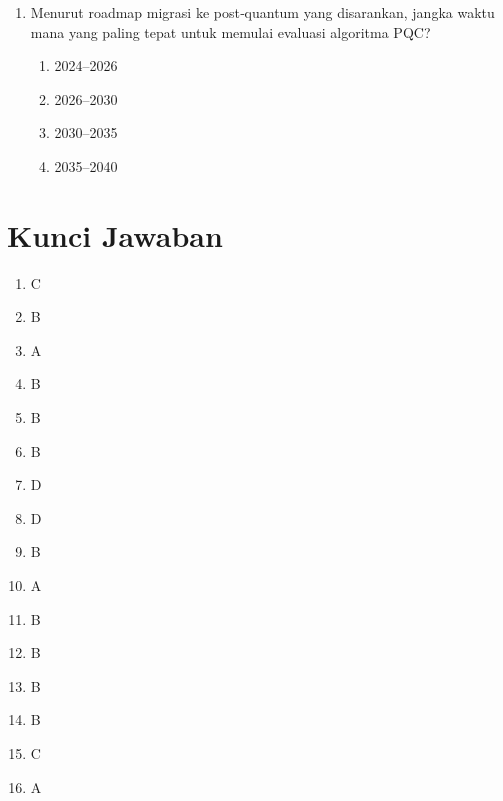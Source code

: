 \documentclass[12pt]{article}
\begin{document}
\begin{enumerate}[label=\textbf{Soal \arabic*.}, leftmargin=*, itemsep=1.5em]
\item Menurut roadmap migrasi ke post‑quantum yang disarankan, jangka waktu mana yang paling tepat untuk memulai evaluasi algoritma PQC?
\begin{enumerate}[label=\Alph*.]
    \item 2024–2026
    \item 2026–2030
    \item 2030–2035
    \item 2035–2040
\end{enumerate}

\end{enumerate}

\newpage
\section*{Kunci Jawaban}
\begin{enumerate}[label=\textbf{Soal \arabic*.}]
    \item C
    \item B
    \item A
    \item B
    \item B
    \item B
    \item D
    \item D
    \item B
    \item A
    \item B
    \item B
    \item B
    \item B
    \item C
    \item A
\end{enumerate}
\end{document}
